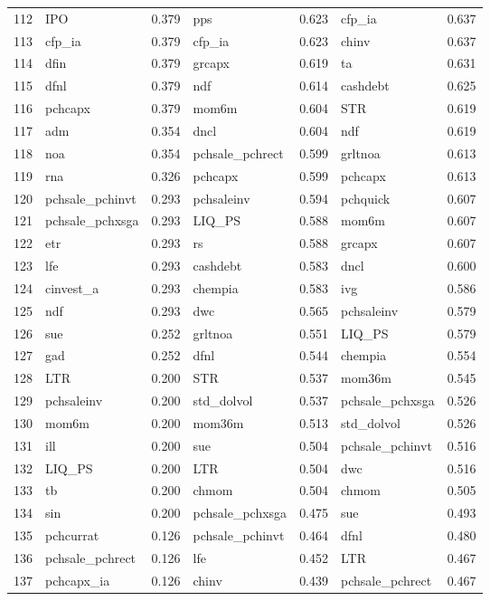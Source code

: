 \begin{footnotesize}
\begin{longtable}{r|lc|lc|lc}
  112 & IPO & 0.379 & pps & 0.623 & cfp\_ia & 0.637 \\ 
  113 & cfp\_ia & 0.379 & cfp\_ia & 0.623 & chinv & 0.637 \\ 
  114 & dfin & 0.379 & grcapx & 0.619 & ta & 0.631 \\ 
  115 & dfnl & 0.379 & ndf & 0.614 & cashdebt & 0.625 \\ 
  116 & pchcapx & 0.379 & mom6m & 0.604 & STR & 0.619 \\ 
  117 & adm & 0.354 & dncl & 0.604 & ndf & 0.619 \\ 
  118 & noa & 0.354 & pchsale\_pchrect & 0.599 & grltnoa & 0.613 \\ 
  119 & rna & 0.326 & pchcapx & 0.599 & pchcapx & 0.613 \\ 
  120 & pchsale\_pchinvt & 0.293 & pchsaleinv & 0.594 & pchquick & 0.607 \\ 
  121 & pchsale\_pchxsga & 0.293 & LIQ\_PS & 0.588 & mom6m & 0.607 \\ 
  122 & etr & 0.293 & rs & 0.588 & grcapx & 0.607 \\ 
  123 & lfe & 0.293 & cashdebt & 0.583 & dncl & 0.600 \\ 
  124 & cinvest\_a & 0.293 & chempia & 0.583 & ivg & 0.586 \\ 
  125 & ndf & 0.293 & dwc & 0.565 & pchsaleinv & 0.579 \\ 
  126 & sue & 0.252 & grltnoa & 0.551 & LIQ\_PS & 0.579 \\ 
  127 & gad & 0.252 & dfnl & 0.544 & chempia & 0.554 \\ 
  128 & LTR & 0.200 & STR & 0.537 & mom36m & 0.545 \\ 
  129 & pchsaleinv & 0.200 & std\_dolvol & 0.537 & pchsale\_pchxsga & 0.526 \\ 
  130 & mom6m & 0.200 & mom36m & 0.513 & std\_dolvol & 0.526 \\ 
  131 & ill & 0.200 & sue & 0.504 & pchsale\_pchinvt & 0.516 \\ 
  132 & LIQ\_PS & 0.200 & LTR & 0.504 & dwc & 0.516 \\ 
  133 & tb & 0.200 & chmom & 0.504 & chmom & 0.505 \\ 
  134 & sin & 0.200 & pchsale\_pchxsga & 0.475 & sue & 0.493 \\ 
  135 & pchcurrat & 0.126 & pchsale\_pchinvt & 0.464 & dfnl & 0.480 \\ 
  136 & pchsale\_pchrect & 0.126 & lfe & 0.452 & LTR & 0.467 \\ 
  137 & pchcapx\_ia & 0.126 & chinv & 0.439 & pchsale\_pchrect & 0.467 \\ 

\end{longtable}
\end{footnotesize}
